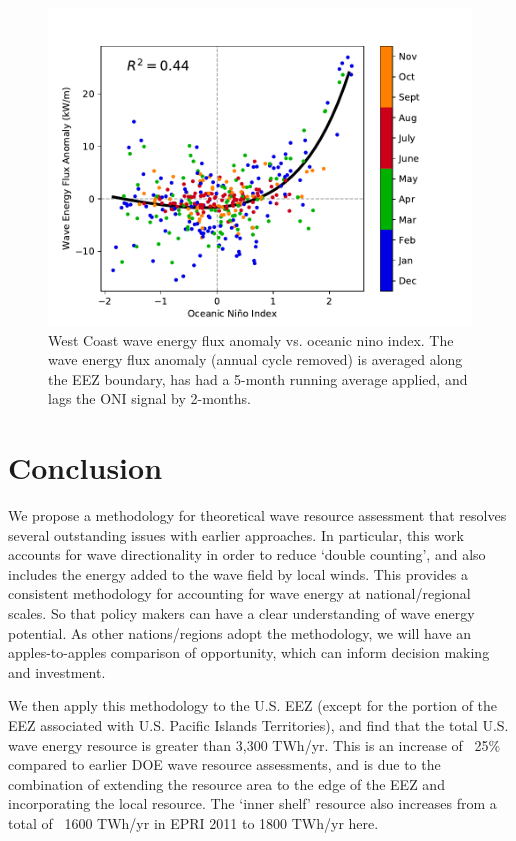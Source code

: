 \begin{figure}[ht]
  \centering
  \includegraphics[width=\textwidth]{../fig/ENSO-Comparison.wc.pdf}
  \caption{West Coast wave energy flux anomaly vs. oceanic nino index. The wave energy flux anomaly (annual cycle removed) is averaged along the EEZ boundary, has had a 5-month running average applied, and lags the ONI signal by 2-months.}
  \label{fig:wc-nino}
\end{figure}


\section{Conclusion} \label{sec:conclusion}

We propose a methodology for theoretical wave resource assessment that resolves several outstanding issues with earlier approaches. In particular, this work accounts for wave directionality in order to reduce `double counting', and also includes the energy added to the wave field by local winds. This provides a consistent methodology for accounting for wave energy at national/regional scales. So that policy makers can have a clear understanding of wave energy potential. As other nations/regions adopt the methodology, we will have an apples-to-apples comparison of opportunity, which can inform decision making and investment.

We then apply this methodology to the U.S. EEZ (except for the portion of the EEZ associated with U.S. Pacific Islands Territories), and find that the total U.S. wave energy resource is greater than 3,300 TWh/yr.
This is an increase of ~25\% compared to earlier DOE wave resource assessments, and is due to the combination of extending the resource area to the edge of the EEZ and incorporating the local resource. The `inner shelf' resource also increases from a total of ~1600 TWh/yr in EPRI 2011 to 1800 TWh/yr here. 

